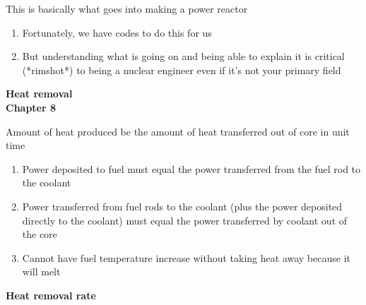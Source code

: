 \documentclass[aspectratio=1610,pdftex,dvipsnames,compress,xcolor={dvipsnames}]{beamer}
\begin{document}
\begin{frame}{This is basically what goes into making a power reactor}
    \begin{enumerate}[series=outerlist,topsep=0pt,itemsep=21pt,leftmargin=*,label=(\arabic*)]
        \item[]Fortunately, we have codes to do this for us
        \item[]But understanding what is going on and being able to explain it is critical (*rimshot*) to being a nuclear engineer even if it's not your primary field
    \end{enumerate}
\end{frame}


\begin{frame}[plain]{}
    \centering\LARGE\textbf{Heat removal}\\
    \centering\LARGE\textbf{Chapter 8}
\end{frame}


\addtocounter{framenumber}{-1} 
\begin{frame}{Amount of heat produced be the amount of heat transferred out of core in unit time}
    \begin{enumerate}[series=outerlist,topsep=0pt,itemsep=21pt,leftmargin=*,label=(\arabic*)]
        \item[]Power deposited to fuel must equal the power transferred from the fuel rod to the coolant
        \item[]Power transferred from fuel rods to the coolant (plus the power deposited directly to the coolant) must equal the power transferred by coolant out of the core
        \item[]Cannot have fuel temperature increase without taking heat away because it will melt
    \end{enumerate}
\end{frame}


\begin{frame}[plain]{}
    \centering\LARGE\textbf{Heat removal rate}
\end{frame}
\end{document}
